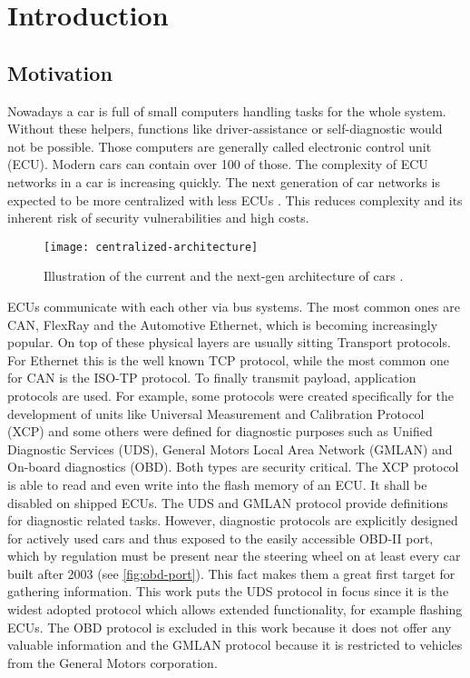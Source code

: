 \section{Introduction}

\subsection{Motivation}
Nowadays a car is full of small computers handling tasks for the whole system. Without these helpers, functions like driver-assistance or self-diagnostic would not be possible. Those computers are generally called electronic control unit (ECU). Modern cars can contain over 100 of those. The complexity of ECU networks in a car is increasing quickly. The next generation of car networks is expected to be more centralized with less ECUs \cite{car-architecture}. This reduces complexity and its inherent risk of security vulnerabilities and high costs.

\begin{figure}[h]
    \centering
    \texttt{[image: centralized-architecture]}
    \caption{Illustration of the current and the next-gen architecture of cars \cite{car-architecture}.}
    \label{fig:centralized-architecture}
\end{figure}

ECUs communicate with each other via bus systems. The most common ones are CAN, FlexRay and the Automotive Ethernet, which is becoming increasingly popular. On top of these physical layers are usually sitting Transport protocols. For Ethernet this is the well known TCP protocol, while the most common one for CAN is the ISO-TP protocol. To finally transmit payload, application protocols are used. For example, some protocols were created specifically for the development of units like Universal Measurement and Calibration Protocol (XCP) and some others were defined for diagnostic purposes such as Unified Diagnostic Services (UDS), General Motors Local Area Network (GMLAN) and On-board diagnostics (OBD). Both types are security critical. The XCP protocol is able to read and even write into the flash memory of an ECU. It shall be disabled on shipped ECUs. The UDS and GMLAN protocol provide definitions for diagnostic related tasks. However, diagnostic protocols are explicitly designed for actively used cars and thus exposed to the easily accessible OBD-II port, which by regulation must be present near the steering wheel on at least every car built after 2003 (see \autoref{fig:obd-port}). This fact makes them a great first target for gathering information. This work puts the UDS protocol in focus since it is the widest adopted protocol which allows extended functionality, for example flashing ECUs. The OBD protocol is excluded in this work because it does not offer any valuable information and the GMLAN protocol because it is restricted to vehicles from the General Motors corporation.

